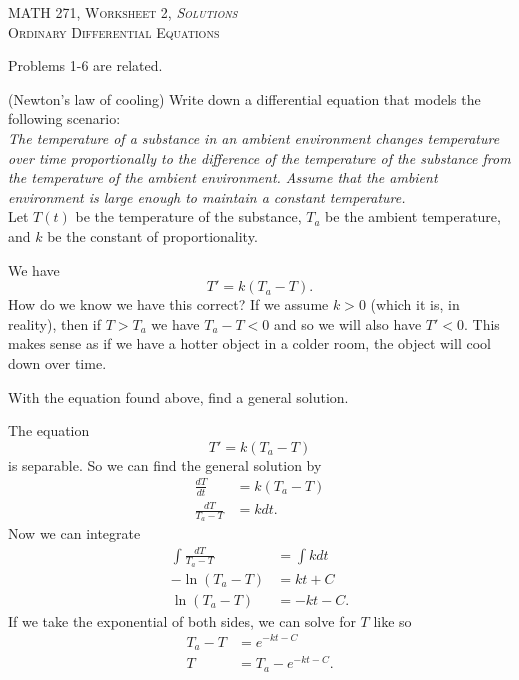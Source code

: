 \documentclass[12pt]{article} %
\begin{document}
\begin{center}
   \textsc{\large MATH 271, Worksheet 2, \emph{Solutions}}\\
   \textsc{Ordinary Differential Equations}
\end{center}
\vspace{.5cm}

\begin{center}
    Problems 1-6 are related.
\end{center}

\begin{problem}
    (Newton's law of cooling) Write down a differential equation that models the following scenario:\\
    
    \noindent\emph{The temperature of a substance in an ambient environment changes temperature over time proportionally to the difference of the temperature of the substance from the temperature of the ambient environment. Assume that the ambient environment is large enough to maintain a constant temperature.}\\
    
    \noindent Let $T(t)$ be the temperature of the substance, $T_a$ be the ambient temperature, and $k$ be the constant of proportionality.
\end{problem}
\begin{solution}
We have
\[
T'=k(T_a-T).
\]
How do we know we have this correct? If we assume $k>0$ (which it is, in reality), then if $T>T_a$ we have $T_a-T<0$ and so we will also have $T'<0$. This makes sense as if we have a hotter object in a colder room, the object will cool down over time.
\end{solution}

\newpage

\begin{problem}
    With the equation found above, find a general solution.
\end{problem}
\begin{solution}
The equation
\[
T'=k(T_a-T)
\]
is separable.  So we can find the general solution by
\begin{align*}
    \frac{dT}{dt}&=k(T_a-T)\\
    \frac{dT}{T_a-T}&=kdt.
\end{align*}
Now we can integrate
\begin{align*}
    \int\frac{dT}{T_a-T} &= \int kdt\\
    -\ln(T_a-T)&=kt+C\\
    \ln(T_a-T)&=-kt-C.
\end{align*}
If we take the exponential of both sides, we can solve for $T$ like so
\begin{align*}
    T_a-T&=e^{-kt-C}\\
    T&=T_a-e^{-kt-C}.
\end{align*}
\end{solution}
\end{document}
